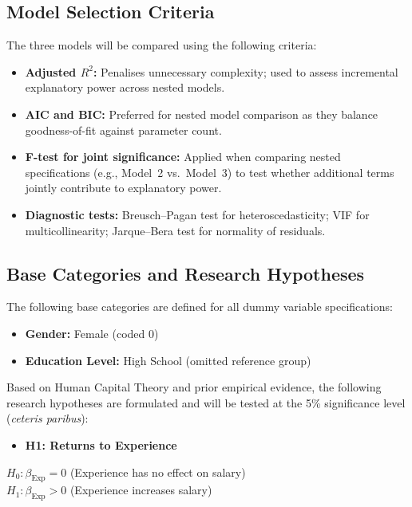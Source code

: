 \documentclass[12pt, a4paper]{article}
\begin{document}
\subsection{Model Selection Criteria}

The three models will be compared using the following criteria:

\begin{itemize}[leftmargin=1.5em]
  \item \textbf{Adjusted $R^2$:} Penalises unnecessary complexity; used to assess
        incremental explanatory power across nested models.
  \item \textbf{AIC and BIC:} Preferred for nested model comparison as they balance
        goodness-of-fit against parameter count.
  \item \textbf{F-test for joint significance:} Applied when comparing nested
        specifications (e.g., Model~2 vs.\ Model~3) to test whether additional terms
        jointly contribute to explanatory power.
  \item \textbf{Diagnostic tests:} Breusch--Pagan test for heteroscedasticity; VIF for
        multicollinearity; Jarque--Bera test for normality of residuals.
\end{itemize}

\subsection{Base Categories and Research Hypotheses}

The following base categories are defined for all dummy variable specifications:

\begin{itemize}[leftmargin=1.5em]
  \item \textbf{Gender:} Female (coded 0)
  \item \textbf{Education Level:} High School (omitted reference group)
\end{itemize}

Based on Human Capital Theory and prior empirical evidence, the following research hypotheses are formulated and will be tested at the 5\% significance level (\textit{ceteris paribus}):

\begin{itemize}[leftmargin=1.5em]
  \item \textbf{H1: Returns to Experience}
\end{itemize}
$H_0: \beta_{\text{Exp}} = 0$ (Experience has no effect on salary)\\
$H_1: \beta_{\text{Exp}} > 0$ (Experience increases salary)
\end{document}
